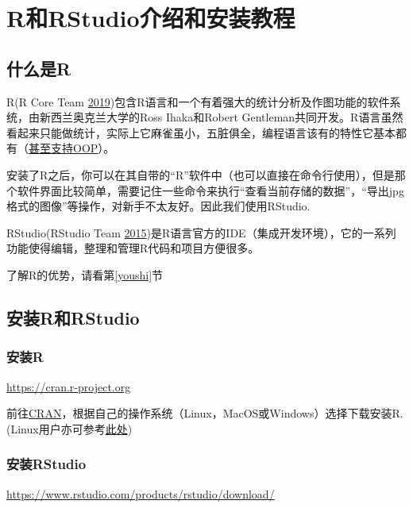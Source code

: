 \documentclass[]{book}
\begin{document}
\hypertarget{intro-and-installation}{%
\chapter{R和RStudio介绍和安装教程}\label{intro-and-installation}}

\hypertarget{r}{%
\section{什么是R}\label{r}}

R(R Core Team \protect\hyperlink{ref-R-base}{2019})包含R语言和一个有着强大的统计分析及作图功能的软件系统，由新西兰奥克兰大学的Ross Ihaka和Robert Gentleman共同开发。R语言虽然看起来只能做统计，实际上它麻雀虽小，五脏俱全，编程语言该有的特性它基本都有（\href{https://adv-r.hadley.nz/oo.html}{甚至支持OOP}）。

安装了R之后，你可以在其自带的``R''软件中（也可以直接在命令行使用），但是那个软件界面比较简单，需要记住一些命令来执行``查看当前存储的数据''，``导出jpg格式的图像''等操作，对新手不太友好。因此我们使用RStudio.

RStudio(RStudio Team \protect\hyperlink{ref-R-rstudio}{2015})是R语言官方的IDE（集成开发环境），它的一系列功能使得编辑，整理和管理R代码和项目方便很多。

了解R的优势，请看第\ref{youshi}节

\hypertarget{rrstudio}{%
\section{安装R和RStudio}\label{rrstudio}}

\hypertarget{r}{%
\subsection{安装R}\label{r}}

\url{https://cran.r-project.org}

前往\href{https://cran.r-project.org}{CRAN}，根据自己的操作系统（Linux，MacOS或Windows）选择下载安装R. (Linux用户亦可参考\href{https://blog.zenggyu.com/en/post/2018-01-29/installing-r-r-packages-e-g-tidyverse-and-rstudio-on-ubuntu-linux/}{此处})

\hypertarget{rstudio}{%
\subsection{安装RStudio}\label{rstudio}}

\url{https://www.rstudio.com/products/rstudio/download/}
\end{document}
